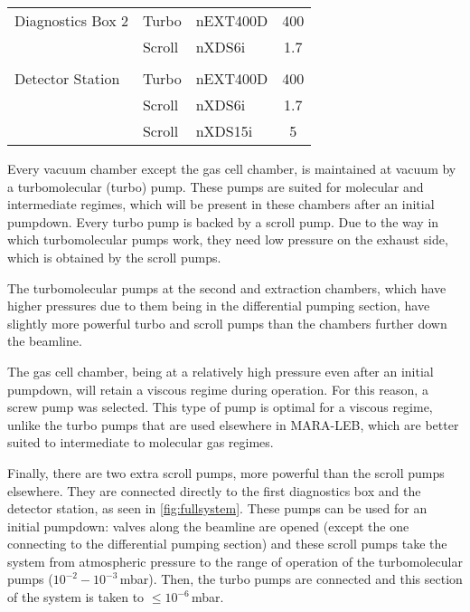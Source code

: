 \begin{table}[h!]
\begin{tabular}{@{}lllc@{}}
                                                            \\
    Diagnostics Box 2   & Turbo     & nEXT400D      & 400   \\
                        & Scroll    & nXDS6i        & 1.7   \\
                                                            \\
    Detector Station    & Turbo     & nEXT400D      & 400   \\
                        & Scroll    & nXDS6i        & 1.7   \\
                        & Scroll    & nXDS15i       & 5     \\
    \hline
    \end{tabular}
 \end{table}

Every vacuum chamber except the gas cell chamber, is maintained at vacuum by a turbomolecular (turbo) pump. These pumps are suited for molecular and intermediate regimes, which will be present in these chambers after an initial pumpdown. Every turbo pump is backed by a scroll pump. Due to the way in which turbomolecular pumps work, they need low pressure on the exhaust side, which is obtained by the scroll pumps.

The turbomolecular pumps at the second and extraction chambers, which have higher pressures due to them being in the differential pumping section, have slightly more powerful turbo and scroll pumps than the chambers further down the beamline.

The gas cell chamber, being at a relatively high pressure even after an initial pumpdown, will retain a viscous regime during operation. For this reason, a screw pump was selected. This type of pump is optimal for a viscous regime, unlike the turbo pumps that are used elsewhere in MARA-LEB, which are better suited to intermediate to molecular gas regimes.

Finally, there are two extra scroll pumps, more powerful than the scroll pumps elsewhere. They are connected directly to the first diagnostics box and the detector station, as seen in \autoref{fig:fullsystem}. These pumps can be used for an initial pumpdown: valves along the beamline are opened (except the one connecting to the differential pumping section) and these scroll pumps take the system from atmospheric pressure to the range of operation of the turbomolecular pumps ($10^{-2} - 10^{-3}\,$mbar). Then, the turbo pumps are connected and this section of the system is taken to $\leq10^{-6}\,$mbar. 

